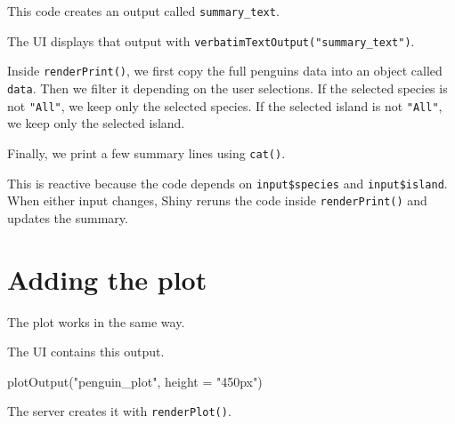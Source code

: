 \documentclass[
  letterpaper,
  DIV=11,
  numbers=noendperiod]{scrreprt}
\newenvironment{Shaded}{\begin{snugshade}}{\end{snugshade}}
\newcommand{\AttributeTok}[1]{\textcolor[rgb]{0.40,0.45,0.13}{#1}}
\newcommand{\FunctionTok}[1]{\textcolor[rgb]{0.28,0.35,0.67}{#1}}
\newcommand{\NormalTok}[1]{\textcolor[rgb]{0.00,0.23,0.31}{#1}}
\newcommand{\StringTok}[1]{\textcolor[rgb]{0.13,0.47,0.30}{#1}}
\begin{document}
This code creates an output called \texttt{summary\_text}.

The UI displays that output with
\texttt{verbatimTextOutput("summary\_text")}.

Inside \texttt{renderPrint()}, we first copy the full penguins data into
an object called \texttt{data}. Then we filter it depending on the user
selections. If the selected species is not \texttt{"All"}, we keep only
the selected species. If the selected island is not \texttt{"All"}, we
keep only the selected island.

Finally, we print a few summary lines using \texttt{cat()}.

This is reactive because the code depends on \texttt{input\$species} and
\texttt{input\$island}. When either input changes, Shiny reruns the code
inside \texttt{renderPrint()} and updates the summary.

\section{Adding the plot}\label{adding-the-plot}

The plot works in the same way.

The UI contains this output.

\begin{Shaded}
\begin{Highlighting}[]
\FunctionTok{plotOutput}\NormalTok{(}\StringTok{"penguin\_plot"}\NormalTok{, }\AttributeTok{height =} \StringTok{"450px"}\NormalTok{)}
\end{Highlighting}
\end{Shaded}

The server creates it with \texttt{renderPlot()}.
\end{document}
